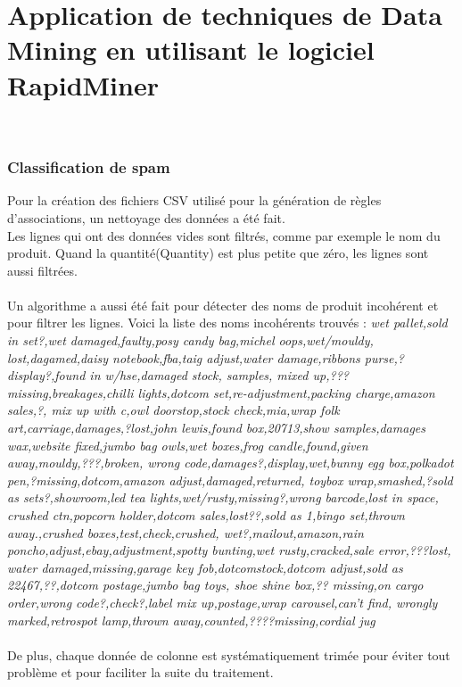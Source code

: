 \documentclass[a4paper]{article}
\begin{document}
\part*{Application de techniques de Data Mining en utilisant le logiciel RapidMiner}
 \\

\section{Classification de spam}
Pour la création des fichiers CSV utilisé pour la génération de règles d'associations, un nettoyage des données a été fait. 
\\
Les lignes qui ont des données vides sont filtrés, comme par exemple le nom du produit. Quand la quantité(Quantity) est plus petite que zéro, les lignes sont aussi filtrées. 
\\\\
Un algorithme a aussi été fait pour détecter des noms de produit incohérent et pour filtrer les lignes. Voici la liste des noms incohérents trouvés :
\textit{wet pallet,sold in set?,wet damaged,faulty,posy candy bag,michel oops,wet/mouldy,
lost,dagamed,daisy notebook,fba,taig adjust,water damage,ribbons purse,?display?,found in w/hse,damaged stock,
samples,
mixed up,???missing,breakages,chilli lights,dotcom set,re-adjustment,packing charge,amazon sales,?,
mix up with c,owl doorstop,stock check,mia,wrap folk art,carriage,damages,?lost,john lewis,found box,20713,show samples,damages wax,website fixed,jumbo bag owls,wet boxes,frog candle,found,given away,mouldy,???,broken,
wrong code,damages?,display,wet,bunny egg box,polkadot pen,?missing,dotcom,amazon adjust,damaged,returned,
toybox  wrap,smashed,?sold as sets?,showroom,led tea lights,wet/rusty,missing?,wrong barcode,lost in space,
crushed ctn,popcorn holder,dotcom sales,lost??,sold as 1,bingo set,thrown away.,crushed boxes,test,check,crushed,
wet?,mailout,amazon,rain poncho,adjust,ebay,adjustment,spotty bunting,wet rusty,cracked,sale error,???lost,
water damaged,missing,garage key fob,dotcomstock,dotcom adjust,sold as 22467,??,dotcom postage,jumbo bag toys,
shoe shine box,?? missing,on cargo order,wrong code?,check?,label mix up,postage,wrap carousel,can't find,
wrongly marked,retrospot lamp,thrown away,counted,????missing,cordial jug}
\\\\
De plus, chaque donnée de colonne est systématiquement trimée pour éviter tout problème et pour faciliter la suite du traitement. 
\\\\
\end{document}
